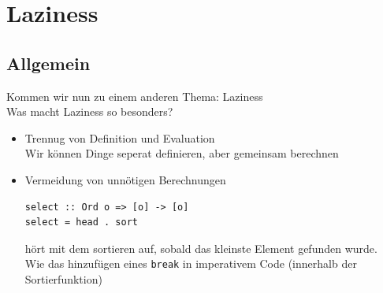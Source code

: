 \documentclass{beamer}
\begin{document}
\section{Laziness}

\subsection{Allgemein}

\begin{frame}[fragile]
Kommen wir nun zu einem anderen Thema: Laziness\\\pause\bigskip
Was macht Laziness so besonders?\pause
\begin{itemize}
 \item Trennug von Definition und Evaluation\\\pause
       Wir können Dinge seperat definieren, aber gemeinsam berechnen
 \pause
 \item Vermeidung von unnötigen Berechnungen\\\pause
\begin{verbatim}
select :: Ord o => [o] -> [o]
select = head . sort
\end{verbatim}
       \pause
       hört mit dem sortieren auf, sobald das kleinste Element gefunden wurde.\\\pause
       Wie das hinzufügen eines \texttt{break} in imperativem Code (innerhalb der Sortierfunktion)
\end{itemize}
\end{frame}
\end{document}
